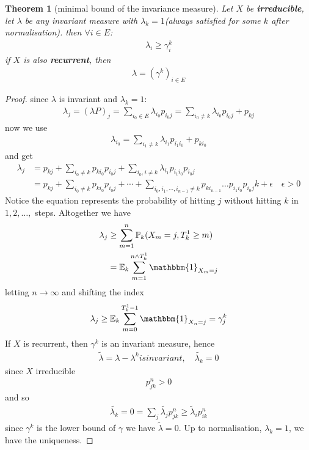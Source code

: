 \documentclass[a4paper,11pt]{book}
\newtheorem{theorem}{Theorem}[section]
\theoremstyle{definition}
\theoremstyle{remark}
\begin{document}
\begin{theorem}[minimal bound of the invariance measure]
	Let $X$ be \textbf{irreducible}, let $\lambda$ be any invariant measure with $\lambda_k = 1$(always satisfied for some $k$ after normalisation).
	then $\forall i \in E$:
	\begin{align*}
		\lambda_i \geq \gamma_i^k 
	\end{align*}
	if $X$ is also \textbf{recurrent}, then
	\begin{align*}
		\lambda = (\gamma^k)_{i \in E}
	\end{align*}
\end{theorem}
\begin{proof}
	since $\lambda$ is invariant and $\lambda_k = 1$:
	\begin{align*}
		\lambda_j = (\lambda P)_j = \sum_{i_0 \in E} \lambda_{i_0} p_{i_0 j} 
		= \sum_{ i_0 \neq k} \lambda_{i_0} p_{i_0j} + p_{kj}
	\end{align*}
	now we use
	\begin{align*}
		\lambda_{i_0} = \sum_{ i_1 \neq k} \lambda_{i_1} p_{i_1 i_0} + p_{k i_0} 		
	\end{align*}
	and get
	\begin{align*}
		\lambda_j &= p_{kj} + \sum_{i_0 \neq k} p_{ki_0} p_{i_0 j} +  \sum_{i_0, i \neq k} \lambda_{i_1}p_{i_1i_0} p_{i_0 j} \\
		&= p_{kj} + \sum_{i_0 \neq k} p_{k i_0} p_{i_0 j} + \cdots + \sum_{i_0, i_1, \cdots, i_{n-1} \neq k}p_{k i_{n-1}} \dots p_{i_1i_0} p_{i_0 j} k + \epsilon \quad \epsilon>0
	\end{align*}
	Notice the equation represents the probability of hitting $j$ without hitting $k$ in $1, 2, \dots, $ steps. Altogether we have
	\begin{align*}
		\lambda_j &\geq \sum_{m = 1}^n \mathbb{P}_k(X_m = j, T_k^1 \geq m)\\
		&= \mathbb{E}_k \sum_{m = 1}^{n \wedge T_k^1}\mathbbm{1}_{X_m = j}
	\end{align*}
	letting $n \rightarrow \infty$ and shifting the index
	\begin{align*}
		\lambda_j \geq \mathbb{E}_k \sum_{m = 0}^{T_k^1 -1} \mathbbm{1}_{X_n = j} = \gamma_j^k
	\end{align*}
	If $X$ is recurrent, then $\gamma^k$ is an invariant measure, hence
	\begin{align*}
		\tilde{\lambda} = \lambda - \lambda^k is invariant, \quad \tilde{\lambda_k} = 0
	\end{align*}
	since $X$ irreducible
	\begin{align*}
		p_{jk}^n  >0
	\end{align*}
	and so
	\begin{align*}
		\tilde{\lambda_k} = 0 = \sum_{j} \tilde{\lambda_j}p_{jk}^n \geq \tilde{\lambda}_i p_{ik}^n
	\end{align*}
	since $\gamma^k$ is the lower bound of $\gamma$ we have $\tilde{\lambda} = 0$.
	Up to normalisation, $\lambda_k= 1$, we have the uniqueness.
\end{proof}
\end{document}
